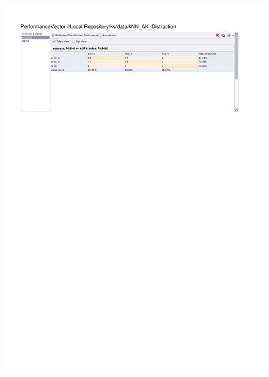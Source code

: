 \begin{figure}[htp]
  \centerline{\includegraphics[trim=0 680 0 60,clip,width=16.09cm]{results/kNN_A_Distraction.pdf}} \caption{
} \label{kNN_A_Distraction}
\end{figure}

